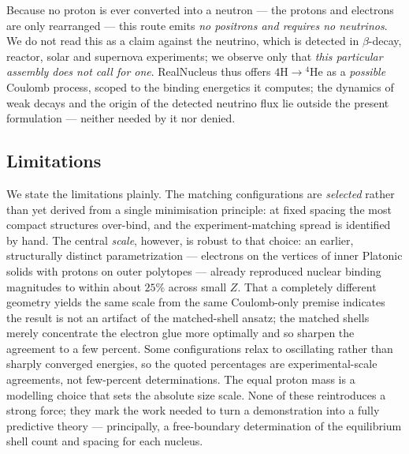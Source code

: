 \documentclass[11pt]{article}
\begin{document}
Because no proton is ever converted into a neutron --- the protons and electrons are only
rearranged --- this route emits \emph{no positrons and requires no neutrinos}. We do not read this
as a claim against the neutrino, which is detected in $\beta$-decay, reactor, solar and supernova
experiments; we observe only that \emph{this particular assembly does not call for one}.
RealNucleus thus offers $4\mathrm{H}\to{}^4\mathrm{He}$ as a \emph{possible} Coulomb process,
scoped to the binding energetics it computes; the dynamics of weak decays and the origin of the
detected neutrino flux lie outside the present formulation --- neither needed by it nor denied.

\subsection{Limitations}

We state the limitations plainly. The matching configurations are \emph{selected} rather than
yet derived from a single minimisation principle: at fixed spacing the most compact structures
over-bind, and the experiment-matching spread is identified by hand. The central \emph{scale},
however, is robust to that choice: an earlier, structurally distinct parametrization --- electrons
on the vertices of inner Platonic solids with protons on outer polytopes --- already reproduced
nuclear binding magnitudes to within about $25\%$ across small $Z$. That a completely different
geometry yields the same scale from the same Coulomb-only premise indicates the result is not an
artifact of the matched-shell ansatz; the matched shells merely concentrate the electron glue more
optimally and so sharpen the agreement to a few percent. Some configurations relax
to oscillating rather than sharply converged energies, so the quoted percentages are
experimental-scale agreements, not few-percent determinations. The equal proton mass is a
modelling choice that sets the absolute size scale. None of these reintroduces a strong force;
they mark the work needed to turn a demonstration into a fully predictive theory --- principally,
a free-boundary determination of the equilibrium shell count and spacing for each nucleus.
\end{document}
